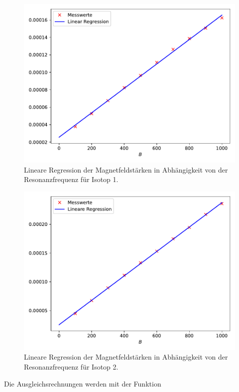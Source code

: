 \begin{figure}
  \centering
  \includegraphics[scale=0.6]{content/plot1.pdf}
  \caption{Lineare Regression der Magnetfeldstärken in Abhängigkeit von der Resonanzfrequenz für Isotop 1.}
  \label{fig:plot1}
\end{figure}

\begin{figure}
  \centering
  \includegraphics[scale=0.6]{content/plot2.pdf}
  \caption{Lineare Regression der Magnetfeldstärken in Abhängigkeit von der Resonanzfrequenz für Isotop 2.}
  \label{fig:plot2}
\end{figure}

Die Ausgleichsrechnungen werden mit der Funktion

